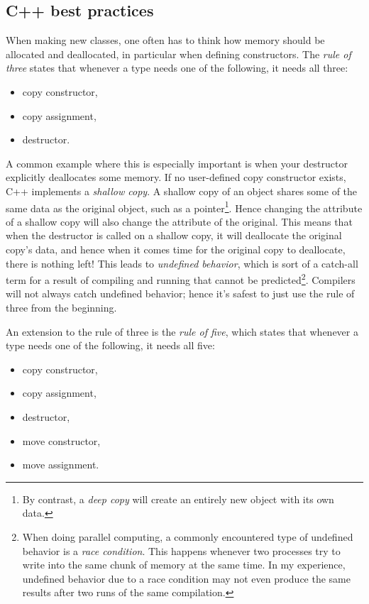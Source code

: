 \subsection{C++ best practices}

When making new classes, one often has to think how memory should be allocated
and deallocated, in particular when defining constructors. The {\it rule of
three} states that whenever a type needs one of the
following, it needs all three:
\begin{itemize}
  \item copy constructor,
  \item copy assignment,
  \item destructor.
\end{itemize}
A common example where this is especially important is when your destructor 
explicitly deallocates some memory. If no user-defined copy constructor exists,
C++ implements a {\it shallow copy}. A shallow copy of an
object shares some of the same data as the original object, such as a 
pointer\footnote{By contrast, a {\it deep copy} will create
an entirely new object with its own data.}.
Hence changing the attribute of a shallow copy will also change the attribute of
the original. This means that when the destructor is called on a shallow copy,
it will deallocate the original copy's data, and hence when it comes time for
the original copy to deallocate, there is nothing left!
This leads to {\it undefined behavior}, which is sort
of a catch-all term for a result of compiling and running that cannot be
predicted\footnote{When doing parallel computing, a commonly encountered type of
undefined behavior is a {\it race condition}. 
This happens whenever two
processes try to write into the same chunk of memory at the same time. In my
experience, undefined behavior due to a race condition may not even produce the
same results after two runs of the same compilation.}. Compilers will not always
catch undefined behavior; hence it's safest to just use the rule of three from
the beginning.

An extension to the rule of three is the {\it rule of five},
which states that whenever a type needs one of the
following, it needs all five: 
\begin{itemize}
  \item copy constructor,
  \item copy assignment,
  \item destructor,
  \item move constructor,
  \item move assignment. 
\end{itemize}


